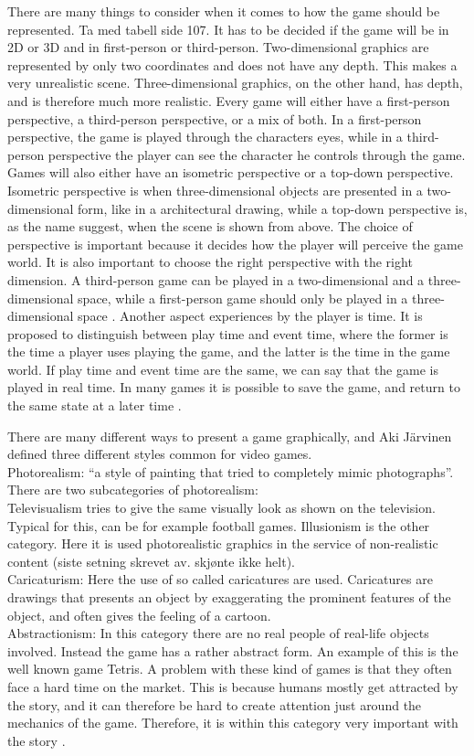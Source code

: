 There are many things to consider when it comes to how the game should be represented. Ta med tabell side 107.  It has to be decided if the game will be in 2D or 3D and in first-person or third-person. Two-dimensional graphics are represented by only two coordinates and does not have any depth. This makes a very unrealistic scene. Three-dimensional graphics, on the other hand, has depth, and is therefore much more realistic. Every game will either have a first-person perspective, a third-person perspective, or a mix of both. In a first-person perspective, the game is played through the characters eyes, while in a third-person perspective the player can see the character he controls through the game. Games will also either have an isometric perspective or a top-down perspective. Isometric perspective is when three-dimensional objects are presented in a two-dimensional form, like in a architectural drawing, while a top-down perspective is, as the name suggest, when the scene is shown from above. The choice of perspective is important because it decides how the player will perceive the game world. It is also important to choose the right perspective with the right dimension. A third-person game can be played in a two-dimensional and a three-dimensional space, while a first-person game should only be played in a three-dimensional space \cite{understandingvg}. Another aspect experiences by the player is time. It is proposed to distinguish between play time and event time, where the former is the time a player uses playing the game, and the latter is the time in the game world. If play time and event time are the same, we can say that the game is played in real time. In many games it is possible to save the game, and return to the same state at a later time \cite{understandingvg}.

There are many different ways to present a game graphically, and Aki Järvinen defined three different styles common for video games. \\ 
Photorealism: “a style of painting that tried to completely mimic photographs”. There are two subcategories of photorealism: \\
Televisualism tries to give the same visually look as shown on the television. Typical for this, can be for example football games. Illusionism is the other category. Here it is used photorealistic graphics in the service of non-realistic content (siste setning skrevet av. skjønte ikke helt). \\
Caricaturism: Here the use of so called caricatures are used. Caricatures are drawings that presents an object by exaggerating the prominent features of the object, and often gives the feeling of a cartoon. \\
Abstractionism: In this category there are no real people of real-life objects involved. Instead  the game has a rather abstract form. An example of this is the well known game Tetris. A problem with these kind of games is that they often face a hard time on the market. This is because humans mostly get attracted by the story, and it can therefore be hard to create attention just around the mechanics of the game. Therefore, it is within this category very important with the story \cite{understandingvg}. 

